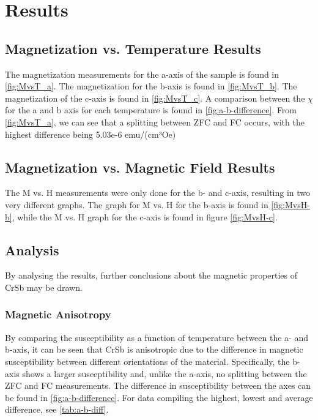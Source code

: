 \section{Results}
    \subsection{Magnetization vs. Temperature Results}
    The magnetization measurements for the a-axis of the sample is found in \autoref{fig:MvsT_a}. The magnetization for the b-axis is found in 
    \autoref{fig:MvsT_b}. The magnetization of the c-axis is found in \autoref{fig:MvsT_c}. A comparison between the $\chi$ for the a and b axis for 
    each temperature is found in \autoref{fig:a-b-difference}.
    From \autoref{fig:MvsT_a}, we can see that a splitting between ZFC and FC occurs, with the highest difference being 5.03e-6 emu/(cm³Oe)
    
    



    \subsection{Magnetization vs. Magnetic Field Results}
    The M vs. H measurements were only done for the b- and c-axis, resulting in two very different graphs. The graph for M vs. H for the b-axis is 
    found in \autoref{fig:MvsH-b}, while the M vs. H graph for the c-axis is found in figure \autoref{fig:MvsH-c}.
    
    
    \subsection{Analysis}
    By analysing the results, further conclusions about the magnetic properties of CrSb may be drawn.
    \subsubsection{Magnetic Anisotropy}
    By comparing the susceptibility as a function of temperature  between the a- and b-axis, it can be seen that CrSb is anisotropic due to the difference in magnetic susceptibility between different orientations of the material. Specifically, the b-axis shows a larger susceptibility and, unlike the a-axis, no splitting between the ZFC and FC measurements. The difference in susceptibility between the axes can be found in \autoref{fig:a-b-difference}. For data compiling the highest, lowest and average difference, see \autoref{tab:a-b-diff}. 
    
